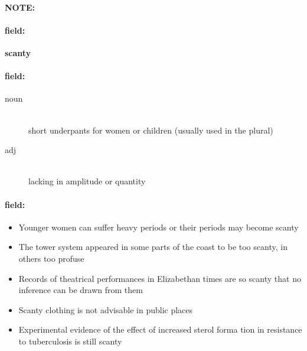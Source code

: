 \documentclass[12pt]{article}
\newenvironment{note}{\paragraph{NOTE:}}{}
\newenvironment{field}{\paragraph{field:}}{}
\begin{document}
\begin{note}
\begin{field}
\textbf{\large scanty}
\end{field}


\begin{field}
\begin{description}
\item[noun] \hfill \\ 
short underpants for women or children (usually used in the plural)

\item[adj] \hfill \\ 
lacking in amplitude or quantity

\end{description}
\end{field}

\begin{field}
\begin{itemize}
\item Younger women can suffer heavy periods or their periods may become scanty
\item The tower system appeared in some parts of the coast to be too scanty, in others too profuse
\item Records of theatrical performances in Elizabethan times are so scanty that no inference can be drawn from them
\item Scanty clothing is not advisable in public places
\item Experimental evidence of the effect of increased sterol forma tion in resistance to tuberculosis is still scanty
\end{itemize}
\end{field}
\end{note}
\end{document}
